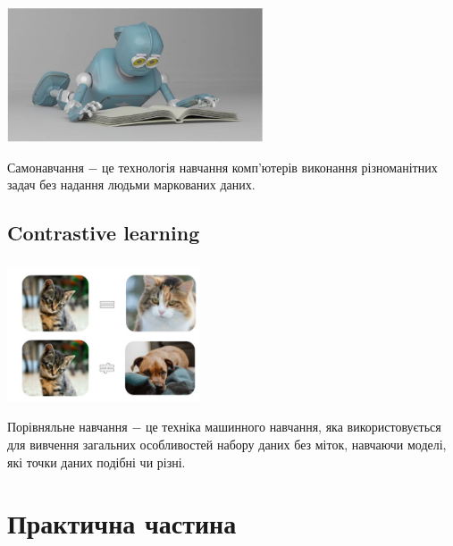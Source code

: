 \documentclass[c]{beamer}
\begin{document}
\begin{frame}
	\frametitle{\insertsection}
	
  	\includegraphics[width=\textwidth, height=4cm, natwidth=850, natheight=450]{self_supervised.jpg}

	Самонавчання $-$ це технологія навчання комп'ютерів виконання різноманітних задач без надання людьми маркованих даних.
\end{frame}

\subsection{Contrastive learning}

\begin{frame}
	\frametitle{\insertsection}
	
  	\includegraphics[width=\textwidth, height=4cm, natwidth=497, natheight=349]{contrastive.jpg}

	Порівняльне навчання $-$ це техніка машинного навчання, яка використовується для вивчення загальних особливостей набору даних без міток, навчаючи моделі, які точки даних подібні чи різні.
\end{frame}

\section{Практична частина}
\end{document}
